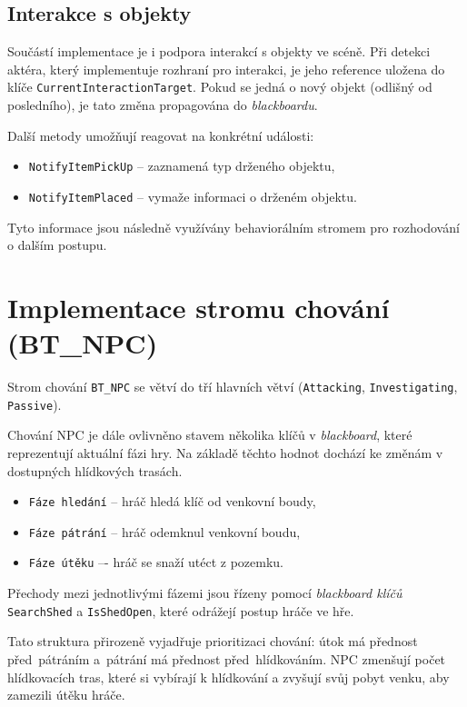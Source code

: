 \subsection{Interakce s objekty}

Součástí implementace je i podpora interakcí s objekty ve scéně.
Při detekci aktéra, který implementuje rozhraní pro interakci, je jeho reference uložena do klíče \texttt{CurrentInteractionTarget}.
Pokud se jedná o nový objekt (odlišný od posledního), je tato změna propagována do \textit{blackboardu}.

Další metody umožňují reagovat na konkrétní události:
\begin{itemize}
    \item \texttt{NotifyItemPickUp} – zaznamená typ drženého objektu,
    \item \texttt{NotifyItemPlaced} – vymaže informaci o drženém objektu.
\end{itemize}

Tyto informace jsou následně využívány behaviorálním stromem pro rozhodování o dalším postupu.

\section{Implementace stromu chování (BT\_NPC)}
\label{sec:implementace-bt-npc}

Strom chování \texttt{BT\_NPC} se větví do tří hlavních větví (\texttt{Attacking}, \texttt{Investigating}, \texttt{Passive}).

Chování NPC je dále ovlivněno stavem několika klíčů v \textit{blackboard}, které reprezentují aktuální fázi hry.
Na základě těchto hodnot dochází ke změnám v dostupných hlídkových trasách.
\begin{itemize}
    \item \texttt{Fáze hledání} -- hráč hledá klíč od venkovní boudy,
    \item \texttt{Fáze pátrání} -- hráč odemknul venkovní boudu,
    \item \texttt{Fáze útěku} –- hráč se snaží utéct z pozemku.
\end{itemize}

Přechody mezi jednotlivými fázemi jsou řízeny pomocí \textit{blackboard klíčů} \texttt{SearchShed} a \texttt{IsShedOpen}, které odrážejí postup 
hráče ve hře.

Tato struktura přirozeně vyjadřuje prioritizaci chování: útok má přednost před~pátráním a~pátrání má přednost před~hlídkováním.
NPC zmenšují počet hlídkovacích tras, které si vybírají k hlídkování a zvyšují svůj pobyt venku, aby zamezili útěku hráče.

